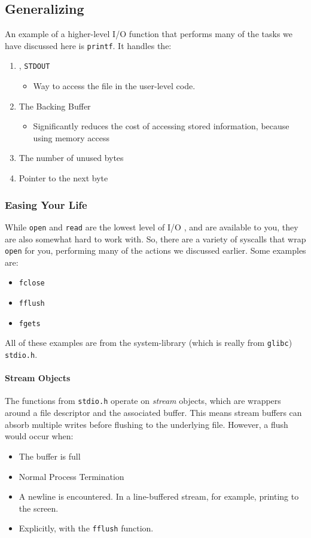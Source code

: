 \subsection{Generalizing}\label{subsec:Generalizing}
An example of a higher-level I/O function that performs many of the tasks we have discussed here is \texttt{printf}.
It handles the:
\begin{enumerate}[noitemsep]
\item {}, \texttt{STDOUT}
  \begin{itemize}[noitemsep]
  \item Way to access the file in the user-level code.
  \end{itemize}
\item The Backing Buffer
  \begin{itemize}[noitemsep]
  \item Significantly reduces the cost of accessing stored information, because using memory access
  \end{itemize}
\item The number of unused bytes
\item Pointer to the next byte
\end{enumerate}

\subsubsection{Easing Your Life}\label{subsubsec:Easing_Your_Life}
While \texttt{open} and \texttt{read} are the lowest level of I/O , and are available to you, they are also somewhat hard to work with.
So, there are a variety of syscalls that wrap \texttt{open} for you, performing many of the actions we discussed earlier.
Some examples are:
\begin{itemize}[noitemsep]
\item \texttt{fclose}
\item \texttt{fflush}
\item \texttt{fgets}
\end{itemize}

All of these examples are from the system-library (which is really from \texttt{glibc}) \texttt{stdio.h}.

\paragraph{Stream Objects}\label{par:Stream_Objects}
The functions from \texttt{stdio.h} operate on \emph{stream} objects, which are wrappers around a file descriptor and the associated buffer.
This means stream buffers can absorb multiple writes before flushing to the underlying file.
However, a flush would occur when:
\begin{itemize}[noitemsep]
\item The buffer is full
\item Normal Process Termination
\item A newline is encountered.
  In a line-buffered stream, for example, printing to the screen.
\item Explicitly, with the \texttt{fflush} function.
\end{itemize}

